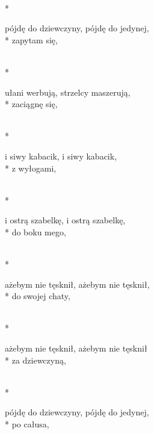 \begin{lyrics}[longestline={hej, tam kule świszczą i bagnety błyszczą,}]

\\*
\begin{markverses}[marktext={bis}]%
pójdę do dziewczyny, pójdę do jedynej,\\*
zapytam się,
\end{markverses}

\\*
\begin{markverses}[marktext={bis}]%
ułani werbują, strzelcy maszerują,\\*
zaciągnę się,
\end{markverses}

\\*
\begin{markverses}[marktext={bis}]%
i siwy kabacik, i siwy kabacik,\\*
z wyłogami,
\end{markverses}

\\*
\begin{markverses}[marktext={bis}]%
i ostrą szabelkę, i ostrą szabelkę,\\*
do boku mego,
\end{markverses}

\\*
\begin{markverses}[marktext={bis}]%
ażebym nie tęsknił, ażebym nie tęsknił,\\*
do swojej chaty,
\end{markverses}

\\*
\begin{markverses}[marktext={bis}]%
ażebym nie tęsknił, ażebym nie tęsknił\\*
za dziewczyną,
\end{markverses}

\\*
\begin{markverses}[marktext={bis}]%
pójdę do dziewczyny, pójdę do jedynej,\\*
po całusa,
\end{markverses}


\end{lyrics}
